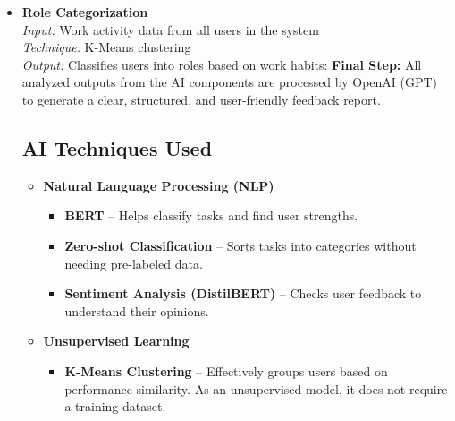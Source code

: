 \begin{itemize}
    \item \textbf{Role Categorization}  
    \\ \textit{Input:} Work activity data from all users in the system
    \\ \textit{Technique:} K-Means clustering  
    \\ \textit{Output:} Classifies users into roles based on work habits:  
    \textbf{Final Step:} All analyzed outputs from the AI components are processed by OpenAI (GPT) to generate a clear, structured, and user-friendly feedback report.
    
    \subsection{AI Techniques Used}
        \begin{itemize}
            \item \textbf{Natural Language Processing (NLP)}
            \begin{itemize}
                \item \textbf{BERT} – Helps classify tasks and find user strengths.
                \item \textbf{Zero-shot Classification} – Sorts tasks into categories without needing pre-labeled data.
                \item \textbf{Sentiment Analysis (DistilBERT)} – Checks user feedback to understand their opinions.
            \end{itemize}
            
            \item \textbf{Unsupervised Learning}
            \begin{itemize}
                \item \textbf{K-Means Clustering} – Effectively groups users based on performance similarity. As an unsupervised model, it does not require a training dataset.
            \end{itemize}
            

\end{itemize}
\end{itemize}
